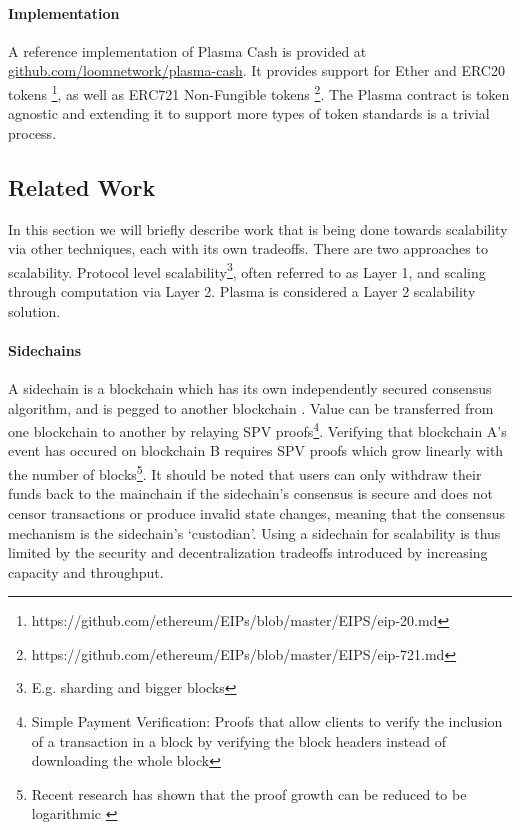 \paragraph{Implementation} A reference implementation of Plasma Cash is
provided at \url{github.com/loomnetwork/plasma-cash}. It provides support for
Ether and ERC20 tokens
\footnote{https://github.com/ethereum/EIPs/blob/master/EIPS/eip-20.md}, 
as well as ERC721 Non-Fungible tokens
\footnote{https://github.com/ethereum/EIPs/blob/master/EIPS/eip-721.md}. 
The Plasma contract is token agnostic and extending it to support more types of
token standards is a trivial process.

\subsection{Related Work}

In this section we will briefly describe work that is being done towards scalability via other techniques, each with its own tradeoffs. 
There are two approaches to scalability. Protocol level scalability\footnote{E.g. sharding and bigger blocks}, often referred to as
Layer 1, and scaling through computation via Layer 2. Plasma is considered a Layer 2 scalability solution.

\paragraph{Sidechains} A sidechain is a blockchain which has its own independently secured consensus algorithm, and 
is pegged to another blockchain \cite{sidechains}. Value can be transferred 
    from one blockchain to another by relaying SPV proofs\footnote{Simple Payment Verification: Proofs that allow clients to verify the inclusion of a transaction in a block by verifying the block headers instead of downloading the whole block}. Verifying 
    that blockchain A's event has occured on blockchain B requires SPV proofs which grow linearly with the number of blocks\footnote{Recent research has shown that the proof growth can be reduced to be logarithmic \cite{nipopows}}. It should be noted that users can only withdraw their funds back to the mainchain if the sidechain's consensus is secure and does not censor transactions or produce invalid state changes, meaning that the consensus mechanism is the sidechain's `custodian'. Using a sidechain for scalability is thus limited by the security and decentralization tradeoffs introduced by increasing capacity and throughput.

